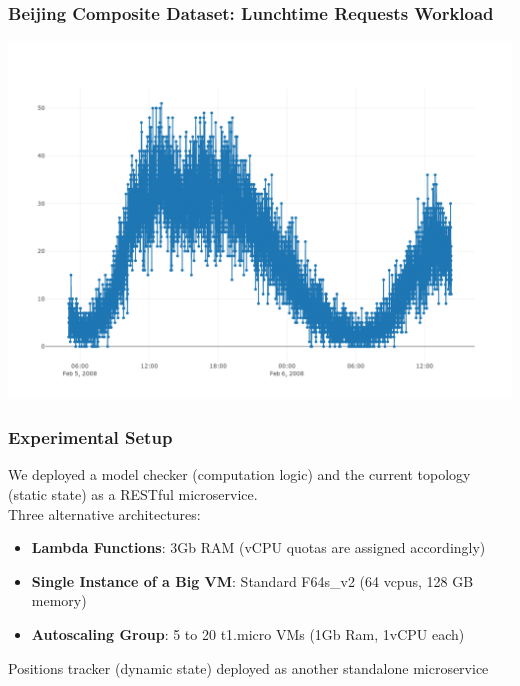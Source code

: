 \documentclass[pdf,10pt]{beamer}
\begin{document}
\begin{frame}\frametitle{Beijing Composite Dataset: Lunchtime Requests Workload}
\begin{center}
  \includegraphics[width=1\textwidth]{img/20sec-feb5.png}
\end{center}
\end{frame}




\begin{frame}\frametitle{Experimental Setup}

We deployed a model checker (computation logic) and the current topology (static state) as a RESTful microservice. \\
Three alternative architectures:
\begin{itemize}
\item \textbf{Lambda Functions}: 3Gb RAM (vCPU quotas are assigned accordingly)
\item \textbf{Single Instance  of a Big VM}: Standard F64s\_v2 (64 vcpus, 128 GB memory)
\item \textbf{Autoscaling Group}: 5 to 20 t1.micro VMs (1Gb Ram, 1vCPU each)
\end{itemize}
Positions tracker (dynamic state) deployed as another standalone microservice

\end{frame}
\end{document}
